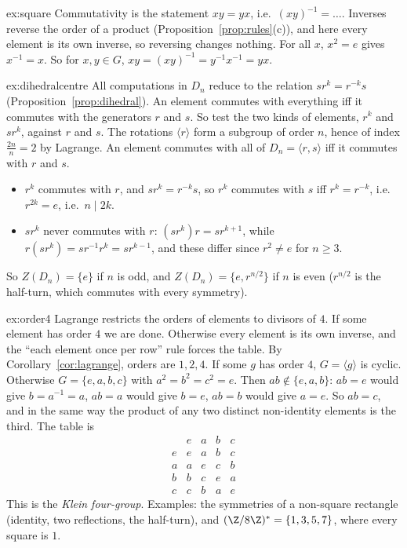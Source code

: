 \begin{solution}{ex:square}
\idea Commutativity is the statement $xy=yx$, i.e.\ $(xy)^{-1}=\dots$. Inverses reverse the order of a product (Proposition~\ref{prop:rules}(c)), and here every element is its own inverse, so reversing changes nothing.
\writeup For all $x$, $x^2=e$ gives $x^{-1}=x$. So for $x,y\in G$, $xy=(xy)^{-1}=y^{-1}x^{-1}=yx$.
\end{solution}

\begin{solution}{ex:dihedralcentre}
\idea All computations in $D_n$ reduce to the relation $sr^k=r^{-k}s$ (Proposition~\ref{prop:dihedral}). An element commutes with everything iff it commutes with the generators $r$ and $s$. So test the two kinds of elements, $r^k$ and $sr^k$, against $r$ and $s$.
\writeup The rotations $\langle r\rangle$ form a subgroup of order $n$, hence of index $\frac{2n}n=2$ by Lagrange. An element commutes with all of $D_n=\langle r,s\rangle$ iff it commutes with $r$ and $s$.
\begin{itemize}
\item $r^k$ commutes with $r$, and $sr^k=r^{-k}s$, so $r^k$ commutes with $s$ iff $r^k=r^{-k}$, i.e.\ $r^{2k}=e$, i.e.\ $n\mid2k$.
\item $sr^k$ never commutes with $r$: $(sr^k)r=sr^{k+1}$, while $r(sr^k)=sr^{-1}r^k=sr^{k-1}$, and these differ since $r^2\ne e$ for $n\ge3$.
\end{itemize}
So $Z(D_n)=\{e\}$ if $n$ is odd, and $Z(D_n)=\{e,r^{n/2}\}$ if $n$ is even ($r^{n/2}$ is the half-turn, which commutes with every symmetry).
\end{solution}

\begin{solution}{ex:order4}
\idea Lagrange restricts the orders of elements to divisors of $4$. If some element has order $4$ we are done. Otherwise every element is its own inverse, and the ``each element once per row'' rule forces the table.
\writeup By Corollary~\ref{cor:lagrange}, orders are $1,2,4$. If some $g$ has order $4$, $G=\langle g\rangle$ is cyclic. Otherwise $G=\{e,a,b,c\}$ with $a^2=b^2=c^2=e$. Then $ab\notin\{e,a,b\}$: $ab=e$ would give $b=a^{-1}=a$, $ab=a$ would give $b=e$, $ab=b$ would give $a=e$. So $ab=c$, and in the same way the product of any two distinct non-identity elements is the third. The table is
\[
\begin{array}{c|cccc}&e&a&b&c\\\hline e&e&a&b&c\\a&a&e&c&b\\b&b&c&e&a\\c&c&b&a&e\end{array}
\]
This is the \emph{Klein four-group}. Examples: the symmetries of a non-square rectangle (identity, two reflections, the half-turn), and $(\Z/8\Z)^*=\{1,3,5,7\}$, where every square is $1$.
\end{solution}

